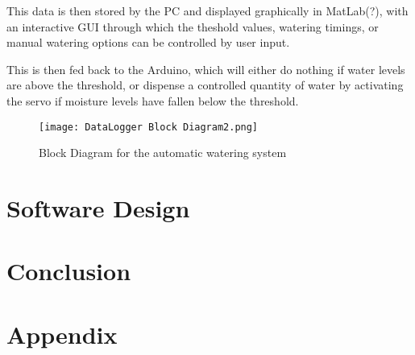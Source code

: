 \documentclass[a4paper,11pt]{article}
\begin{document}
This data is then stored by the PC and displayed graphically in MatLab(?), 
with an interactive GUI through which the 
theshold values, watering timings, or manual watering options
can be controlled by user input.

This is then fed back to the Arduino, 
which will either do nothing if water levels are above the threshold,
or dispense a controlled quantity of water by activating the servo
if moisture levels have fallen below the threshold.

\begin{figure}[H]
    \centering
    \texttt{[image: DataLogger Block Diagram2.png]}
    \caption{Block Diagram for the automatic watering system}
    \label{fig:Block_Diagram_for_the_automatic_watering_system}
\end{figure}

\section{Software Design}
\label{sec:Software_Design}

\section{Conclusion}
\label{sec:Conclusion}

\appendix
\section{Appendix}
\end{document}
